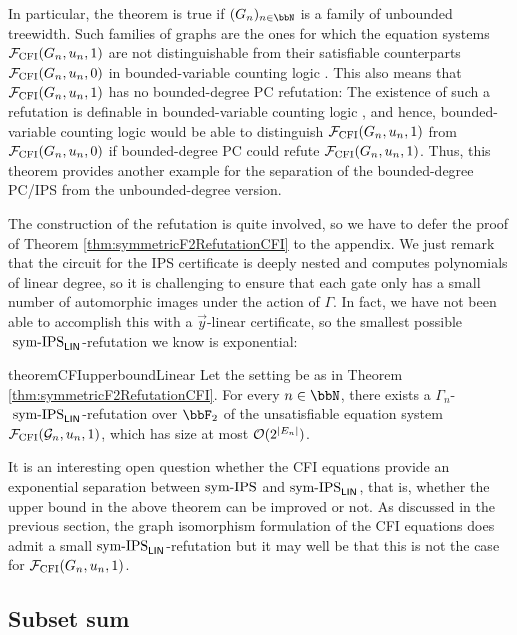 \documentclass[10pt,a4paper]{article}
\newcommand{\Ff}{{\cal F}}
\newcommand{\Gg}{{\cal G}}
\newcommand{\Oo}{{\cal O}}
\newcommand{\CFI}{\Ff_{\mathrm{CFI}}}
\newcommand{\symIPS}{\text{ \upshape sym-IPS}}
\newcommand{\symIPSlin}{\text{ \upshape sym-IPS}_{\mathsf{LIN}}}
\begin{document}
In particular, the theorem is true if $(G_n)_{n \in \bbN}$ is a family of unbounded treewidth. Such families of graphs are the ones for which the equation systems $\CFI(G_n, u_n, 1)$ are not distinguishable from their satisfiable counterparts $\CFI(G_n, u_n, 0)$ in bounded-variable counting logic \cite{atseriasBulatovDawar}.
This also means that $\CFI(G_n, u_n, 1)$ has no bounded-degree PC refutation: The existence of such a refutation is definable in bounded-variable counting logic \cite{ggpp}, and hence, bounded-variable counting logic would be able to distinguish $\CFI(G_n, u_n, 1)$ from $\CFI(G_n, u_n, 0)$ if bounded-degree PC could refute $\CFI(G_n, u_n, 1)$. Thus, this theorem provides another example for the separation of the bounded-degree PC/IPS from the unbounded-degree version.

The construction of the refutation is quite involved, so we have to defer the proof of Theorem \ref{thm:symmetricF2RefutationCFI} to the appendix. We just remark that the circuit for the IPS certificate is deeply nested and computes polynomials of linear degree, so it is challenging to ensure that each gate only has a small number of automorphic images under the action of $\Gamma$. In fact, we have not been able to accomplish this with a $\vec{y}$-linear certificate, so the smallest possible$\symIPSlin{}$-refutation we know is exponential:
\begin{restatable}{theorem}{CFIupperboundLinear}
	\label{thm:symHilbertLikeCFI}
	Let the setting be as in Theorem \ref{thm:symmetricF2RefutationCFI}.
	For every $n \in \bbN$, there exists a $\Gamma_n$-$\symIPSlin$-refutation over $\bbF_2$ of the unsatisfiable equation system $\CFI(\Gg_n, u_n, 1)$, which has size at most $\Oo(2^{|E_n|})$.
\end{restatable}	
It is an interesting open question whether the CFI equations provide an exponential separation between$\symIPS{}$ and$\symIPSlin{}$, that is, whether the upper bound in the above theorem can be improved or not. As discussed in the previous section, the graph isomorphism formulation of the CFI equations does admit a small$\symIPSlin{}$-refutation but it may well be that this is not the case for $\CFI(G_n, u_n, 1)$.




\subsection{Subset sum}
\end{document}
